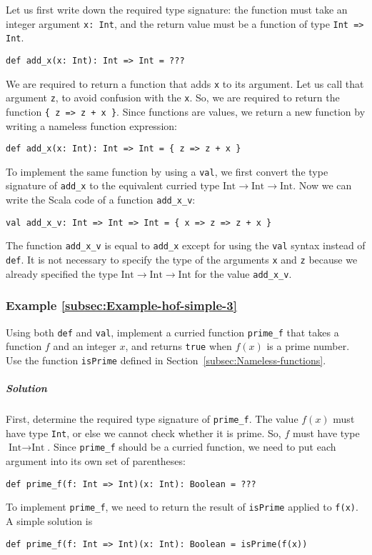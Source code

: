 Let us first write down the required type signature: the function
must take an integer argument \lstinline!x: Int!, and the return
value must be a function of type \lstinline!Int => Int!.
\begin{lstlisting}
def add_x(x: Int): Int => Int = ???
\end{lstlisting}
We are required to return a function that adds \lstinline!x! to its
argument. Let us call that argument \lstinline!z!, to avoid confusion
with the \lstinline!x!. So, we are required to return the function
\lstinline!{ z => z + x }!. Since functions are values, we return
a new function by writing a nameless function expression:
\begin{lstlisting}
def add_x(x: Int): Int => Int = { z => z + x }
\end{lstlisting}
To implement the same function by using a \lstinline!val!, we first
convert the type signature of \lstinline!add_x! to the equivalent
curried type $\text{Int}\rightarrow\text{Int}\rightarrow\text{Int}$.
Now we can write the Scala code of a function \lstinline!add_x_v!:
\begin{lstlisting}
val add_x_v: Int => Int => Int = { x => z => z + x }
\end{lstlisting}
The function \lstinline!add_x_v! is equal to \lstinline!add_x! except
for using the \lstinline!val! syntax instead of \lstinline!def!.
It is not necessary to specify the type of the arguments \lstinline!x!
and \lstinline!z! because we already specified the type $\text{Int}\rightarrow\text{Int}\rightarrow\text{Int}$
for the value \lstinline!add_x_v!. 

\subsubsection{Example \label{subsec:Example-hof-simple-3}\ref{subsec:Example-hof-simple-3}}

Using both \lstinline!def! and \lstinline!val!, implement a curried
function \lstinline!prime_f! that takes a function $f$ and an integer
$x$, and returns \lstinline!true! when $f(x)$ is a prime number.
Use the function \lstinline!isPrime! defined in Section~\ref{subsec:Nameless-functions}. 

\subparagraph{Solution}

First, determine the required type signature of \lstinline!prime_f!.
The value $f(x)$ must have type \lstinline!Int!, or else we cannot
check whether it is prime. So, $f$ must have type $\text{Int}\rightarrow\text{Int}$.
Since \lstinline!prime_f! should be a curried function, we need to
put each argument into its own set of parentheses:
\begin{lstlisting}
def prime_f(f: Int => Int)(x: Int): Boolean = ???
\end{lstlisting}
To implement \lstinline!prime_f!, we need to return the result of
\lstinline!isPrime! applied to \lstinline!f(x)!. A simple solution
is
\begin{lstlisting}
def prime_f(f: Int => Int)(x: Int): Boolean = isPrime(f(x))
\end{lstlisting}

